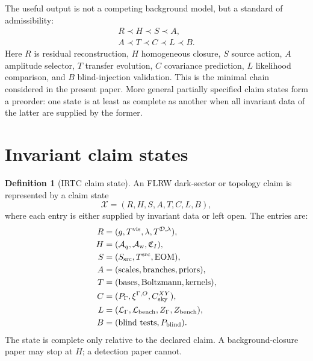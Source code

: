 \documentclass[
  aps,
  prd,
  reprint,
  superscriptaddress,
  floatfix,
  nofootinbib,
  longbibliography
]{revtex4-2}
\theoremstyle{plain}
\theoremstyle{definition}
\newtheorem{definition}[theorem]{Definition}
\theoremstyle{remark}
\newcommand{\D}{\mathcal D}
\newcommand{\vis}{\mathrm{vis}}
\newcommand{\Aq}{\mathcal A_q}
\newcommand{\Aw}{\mathcal A_{\mathrm w}}
\newcommand{\Lcal}{\mathcal L}
\newcommand{\Xcal}{\mathcal X}
\begin{document}
The useful output is not a competing background model, but a standard of admissibility:
\begin{equation}
\boxed{
\begin{gathered}
R\prec H\prec S\prec A,\\
A\prec T\prec C\prec L\prec B.
\end{gathered}}
\label{eq:completion_chain}
\end{equation}
Here $R$ is residual reconstruction, $H$ homogeneous closure, $S$ source action, $A$ amplitude selector, $T$ transfer evolution, $C$ covariance prediction, $L$ likelihood comparison, and $B$ blind-injection validation.  This is the minimal chain considered in the present paper.  More general partially specified claim states form a preorder: one state is at least as complete as another when all invariant data of the latter are supplied by the former.

\section{Invariant claim states}

\begin{definition}[IRTC claim state]
An FLRW dark-sector or topology claim is represented by a claim state
\begin{equation}
\Xcal=(R,H,S,A,T,C,L,B),
\label{eq:claim_state}
\end{equation}
where each entry is either supplied by invariant data or left open.  The entries are:
\begin{align}
R&=(g,T^{\vis},\lambda,T^{\D,\lambda}),\nonumber\\
H&=(\Aq,\Aw,\mathfrak C_I),\nonumber\\
S&=(S_{\rm src},T^{\rm src},\mathrm{EOM}),\nonumber\\
A&=(\mathrm{scales},\mathrm{branches},\mathrm{priors}),\nonumber\\
T&=(\mathrm{bases},\mathrm{Boltzmann},\mathrm{kernels}),\nonumber\\
C&=(P_\Gamma,\xi^{\Gamma,O},C^{XY}_{\rm sky}),\nonumber\\
L&=(\Lcal_\Gamma,\Lcal_{\rm bench},Z_\Gamma,Z_{\rm bench}),\nonumber\\
B&=(\mathrm{blind\ tests},P_{\rm blind}).
\end{align}
The state is complete only relative to the declared claim.  A background-closure paper may stop at $H$; a detection paper cannot.
\end{definition}
\end{document}
